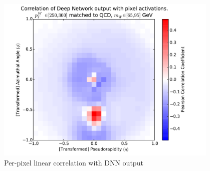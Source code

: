 \documentclass{article}
\begin{document}
\begin{figure}[!htbp]
  \centering
  \includegraphics[width=0.95\textwidth]{figures/pixel-activations-corr.pdf}
  \caption{Per-pixel linear correlation with DNN output}
  \label{fig:corr}
\end{figure}
\end{document}
